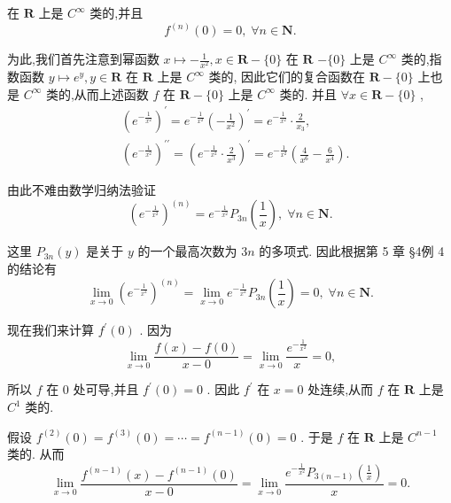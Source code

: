 在 $\mathbf{R}$ 上是 ${C}^{\infty }$ 类的,并且
$${f}^{\left( n\right) }\left( 0\right)  = 0,\;\forall n \in  \mathbf{N}.$$

为此,我们首先注意到幂函数 $x \mapsto   - \frac{1}{{x}^{2}},x \in  \mathbf{R} - \{ 0\}$ 在 $\mathbf{R}$  $- \{ 0\}$ 上是 ${C}^{\infty }$ 类的,指数函数 $y \mapsto  {e}^{y},y \in  \mathbf{R}$ 在 $\mathbf{R}$ 上是 ${C}^{\infty }$ 类的, 因此它们的复合函数在 $\mathbf{R} - \{ 0\}$ 上也是 ${C}^{\infty }$ 类的,从而上述函数 $f$ 在 $\mathbf{R} - \{ 0\}$ 上是 ${C}^{\infty }$ 类的. 并且 $\forall x \in  \mathbf{R} - \{ 0\}$ ,
\begin{align*}
	&{\left( {e}^{-\frac{1}{{x}^{2}}}\right) }^{\prime } = {e}^{-\frac{1}{{x}^{2}}}{\left( -\frac{1}{{x}^{2}}\right) }^{\prime } = {e}^{-\frac{1}{{x}^{2}}} \cdot  \frac{2}{{x}_{3}},\\
	&{\left( {e}^{-\frac{1}{{x}^{2}}}\right) }^{\prime \prime } = {\left( {e}^{-\frac{1}{{x}^{2}}} \cdot  \frac{2}{{x}^{3}}\right) }^{\prime } = {e}^{-\frac{1}{{x}^{2}}}\left( {\frac{4}{{x}^{6}} - \frac{6}{{x}^{4}}}\right) .
\end{align*}

由此不难由数学归纳法验证
$${\left( {e}^{-\frac{1}{{x}^{2}}}\right) }^{\left( n\right) } = {e}^{-\frac{1}{{x}^{2}}}{P}_{3n}\left( \frac{1}{x}\right) ,\;\forall n \in  \mathbf{N}.$$

这里 ${P}_{3n}\left( y\right)$ 是关于 $y$ 的一个最高次数为 ${3n}$ 的多项式. 因此根据第 5 章 §4例 4 的结论有
$$\mathop{\lim }\limits_{{x \rightarrow  0}}{\left( {e}^{-\frac{1}{{x}^{2}}}\right) }^{\left( n\right) } = \mathop{\lim }\limits_{{x \rightarrow  0}}{e}^{-\frac{1}{{x}^{2}}}{P}_{3n}\left( \frac{1}{x}\right)  = 0,\;\forall n \in  \mathbf{N}.$$

现在我们来计算 ${f}^{\prime }\left( 0\right)$ . 因为
$$\mathop{\lim }\limits_{{x \rightarrow  0}}\frac{f\left( x\right)  - f\left( 0\right) }{x - 0} = \mathop{\lim }\limits_{{x \rightarrow  0}}\frac{{e}^{-\frac{1}{{x}^{2}}}}{x} = 0,$$

所以 $f$ 在 0 处可导,并且 ${f}^{\prime }\left( 0\right)  = 0$ . 因此 ${f}^{\prime }$ 在 $x = 0$ 处连续,从而 $f$ 在 $\mathbf{R}$ 上是 ${C}^{1}$ 类的.

假设 ${f}^{\left( 2\right) }\left( 0\right)  = {f}^{\left( 3\right) }\left( 0\right)  = \cdots  = {f}^{\left( n - 1\right) }\left( 0\right)  = 0$ . 于是 $f$ 在 $\mathbf{R}$ 上是 ${C}^{n - 1}$ 类的. 从而
$$\mathop{\lim }\limits_{{x \rightarrow  0}}\frac{{f}^{\left( n - 1\right) }\left( x\right)  - {f}^{\left( n - 1\right) }\left( 0\right) }{x - 0} = \mathop{\lim }\limits_{{x \rightarrow  0}}\frac{{e}^{-\frac{1}{{x}^{2}}}{P}_{3\left( {n - 1}\right) }\left( \frac{1}{x}\right) }{x} = 0.$$

